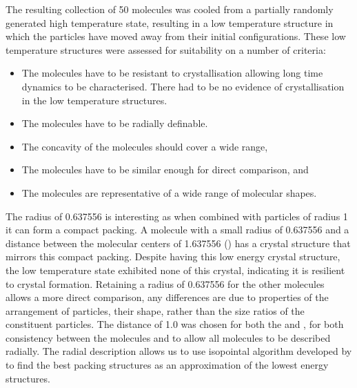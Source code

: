 The resulting collection of 50 molecules was cooled from a partially randomly generated high temperature state, resulting in a low temperature structure in which the particles have moved away from their initial configurations. These low temperature structures were assessed for suitability on a number of criteria:
\begin{itemize}
    \item The molecules have to be resistant to crystallisation allowing long time dynamics to be characterised. There had to be no evidence of crystallisation in the low temperature structures.
    \item The molecules have to be radially definable.
    \item The concavity of the molecules should cover a wide range,
    \item The molecules have to be similar enough for direct comparison, and
    \item The molecules are representative of a wide range of molecular shapes.
\end{itemize}
The radius of 0.637556 is interesting as when combined with particles of radius 1 it can form a compact packing. A molecule with a small radius of 0.637556 and a distance between the molecular centers of 1.637556 (\scon) has a crystal structure that mirrors this compact packing. Despite \scon having this low energy crystal structure, the low temperature state exhibited none of this crystal, indicating it is resilient to crystal formation. Retaining a radius of 0.637556 for the other molecules allows a more direct comparison, any differences are due to properties of the arrangement of particles, their shape, rather than the size ratios of the constituent particles. The distance of 1.0 was chosen for both the \tri and \sone, for both consistency between the molecules and to allow all molecules to be described radially. The radial description allows us to use isopointal algorithm developed by \textcite{hudson:10} to find the best packing structures as an approximation of the lowest energy structures.

